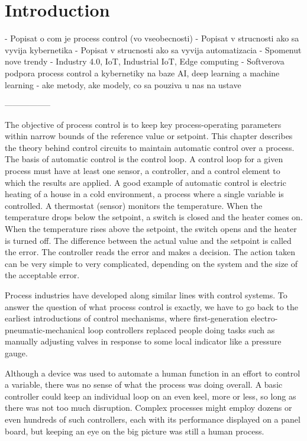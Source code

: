 \setcounter{page}{1}
\setcounter{equation}{0}
\setcounter{figure}{0}
\setcounter{table}{0}

\section{Introduction}

- Popisat o com je process control (vo vseobecnosti)
- Popisat v strucnosti ako sa vyvija kybernetika
- Popisat v strucnosti ako sa vyvija automatizacia
- Spomenut nove trendy - Industry 4.0, IoT, Industrial IoT, Edge computing
- Softverova podpora process control a kybernetiky na baze AI, deep learning a machine learning - ake metody, ake modely, co sa pouziva u nas na ustave

-----------------

The objective of process control is to keep key process-operating parameters within narrow bounds of the reference value or setpoint. This chapter describes the theory behind control circuits to maintain automatic control over a process. The basis of automatic control is the control loop. A control loop for a given process must have at least one sensor, a controller, and a control element to which the results are applied. A good example of automatic control is electric heating of a house in a cold environment, a process where a single variable is controlled. A thermostat (sensor) monitors the temperature. When the temperature drops below the setpoint, a switch is closed and the heater comes on. When the temperature rises above the setpoint, the switch opens and the heater is turned off. The difference between the actual value and the setpoint is called the error. The controller reads the error and makes a decision. The action taken can be very simple to very complicated, depending on the system and the size of the acceptable error.

Process industries have developed along similar lines with control systems. To answer the question of what process control is exactly, we have to go back to the earliest introductions of control mechanisms, where first-generation electro-pneumatic-mechanical loop controllers replaced people doing tasks such as manually adjusting valves in response to some local indicator like a pressure gauge.



Although a device was used to automate a human function in an effort to control a variable, there was no sense of what the process was doing overall. A basic controller could keep an individual loop on an even keel, more or less, so long as there was not too much disruption. Complex processes might employ dozens or even hundreds of such controllers, each with its performance displayed on a panel board, but keeping an eye on the big picture was still a human process.


